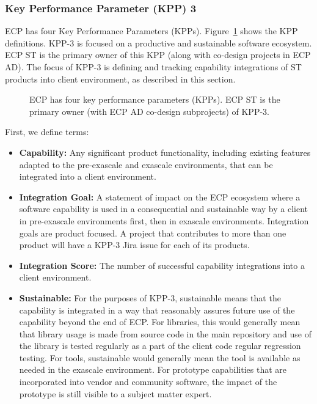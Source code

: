 \subsubsection{Key Performance Parameter (KPP) 3}

ECP has four Key Performance Parameters (KPPs).  Figure~\ref{fig:kpp-definitions} shows the KPP definitions. KPP-3 is focused on a productive and sustainable software ecosystem. ECP ST is the primary owner of this KPP (along with co-design projects in ECP AD).  The focus of KPP-3 is defining and tracking capability integrations of ST products into client environment, as described in this section. 

\begin{figure}
	\centering
	\caption{ECP has four key performance parameters (KPPs).  ECP ST is the primary owner (with ECP AD co-design subprojects) of KPP-3.}
	\label{fig:kpp-definitions}
\end{figure}



First, we define terms:
\begin{itemize}
	\item \textbf{Capability:} Any significant product functionality, including existing features adapted to the pre-exascale and exascale environments, that can be integrated into a client environment.
	\item \textbf{Integration Goal:} A statement of impact on the ECP ecosystem where a software capability is used in a consequential and sustainable way by a client in pre-exascale environments first, then in exascale environments.  Integration goals are product focused.  A project that contributes to more than one product will have a KPP-3 Jira issue for each of its products.
	\item \textbf{Integration Score: }The number of successful capability integrations into a client environment.
	\item \textbf{Sustainable:} For the purposes of KPP-3, sustainable means that the capability is integrated in a way that reasonably assures future use of the capability beyond the end of ECP.  For libraries, this would generally mean that library usage is made from source code in the main repository and use of the library is tested regularly as a part of the client code regular regression testing.  For tools, sustainable would generally mean the tool is available as needed in the exascale environment.  For prototype capabilities that are incorporated into vendor and community software, the impact of the prototype is still visible to a subject matter expert.
\end{itemize}


